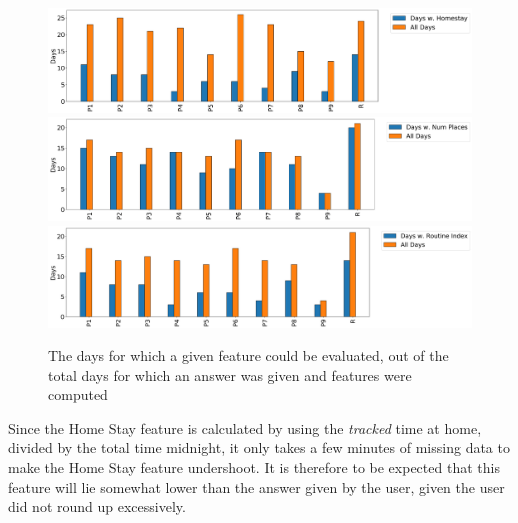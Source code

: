 \begin{figure}
    \centering
    \includegraphics[width=\textwidth]{images/study/homestay_valid_days.png}
    \includegraphics[width=\textwidth]{images/study/numplaces_valid_days.png}
    \includegraphics[width=\textwidth]{images/study/routine_valid_days.png}
    \caption{The days for which a given feature could be evaluated, out of the total days for which an answer was given and features were computed}
    \label{fig:plot-daily}
\end{figure}

Since the Home Stay feature is calculated by using the \textit{tracked} time at home, divided by the total time midnight, it only takes a few minutes of missing data to make the Home Stay feature undershoot. It is therefore to be expected that this feature will lie somewhat lower than the answer given by the user, given the user did not round up excessively.


